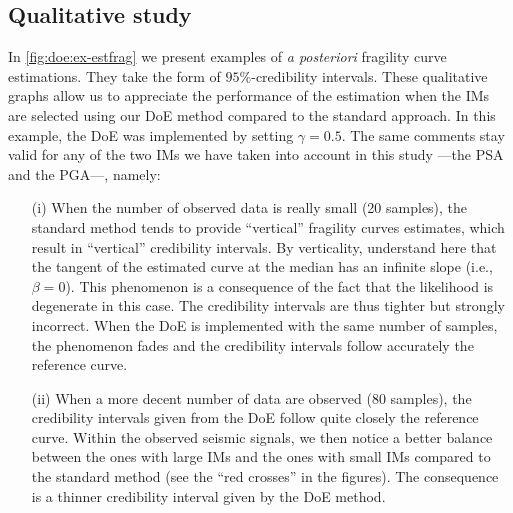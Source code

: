     \subsection{Qualitative study}



    In  \cref{fig:doe:ex-estfrag} we present examples of \emph{a posteriori} fragility curve estimations. They take the form of {$95\%$-credibility intervals. These qualitative graphs allow us to appreciate the performance of the estimation when the IMs are selected using our DoE method compared to the standard approach. In this example, the DoE was implemented by setting $\gamma=0.5$.} The same comments stay valid for any of the two IMs we have taken into account in this study ---the PSA and the PGA---, namely: 
    \begin{enumerate}
        \item[(i)] When the number of observed data is really small (20 samples), the standard method tends to provide ``vertical'' fragility curves estimates, which result in ``vertical'' credibility intervals. By verticality, understand here that the tangent of the estimated curve at the median has an infinite slope (i.e., $\beta=0$). This phenomenon is a consequence of the fact that the likelihood is degenerate in this case.
        The credibility intervals are thus tighter but strongly incorrect.
        When the DoE is implemented with the same number of samples, the phenomenon fades and the credibility intervals follow accurately the reference curve.
        \item[(ii)] When a more decent number of data are observed (80 samples), the credibility intervals given from the DoE follow quite closely the reference curve. Within the observed seismic signals, we then notice a better balance between the ones with large IMs and the ones with small IMs compared to the standard method {(see the ``red crosses'' in the figures).} The consequence is a thinner credibility interval given by the DoE method.
    \end{enumerate}
    
